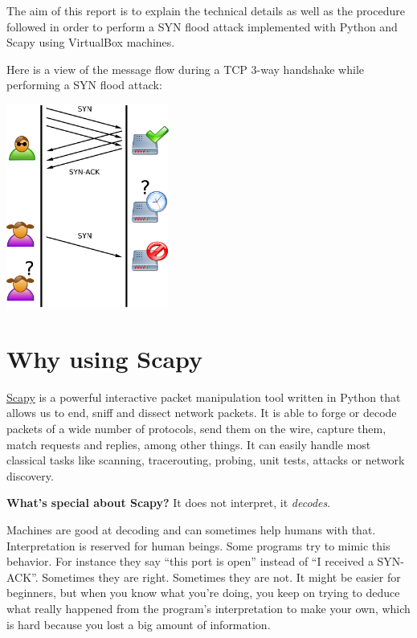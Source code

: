 \documentclass[11pt]{article}
\begin{document}
The aim of this report is to explain the technical details as well as the procedure followed in order to perform a SYN flood attack implemented with Python and Scapy using VirtualBox machines.\vspace{5mm}

Here is a view of the message flow during a TCP 3-way handshake while performing a SYN flood attack:

\begin{center}
\vfill
\includegraphics[width=0.4\textwidth]{tcp-synflood.png}\\[1cm]
\end{center}

\clearpage

\section{Why using Scapy}
\href{https://scapy.net}{Scapy} is a powerful interactive packet manipulation tool written in Python that allows us to end, sniff and dissect network packets. It is able to forge or decode packets of a wide number of protocols, send them on the wire, capture them, match requests and replies, among other things. It can easily handle most classical tasks like scanning, tracerouting, probing, unit tests, attacks or network discovery.\vspace{5mm}

\textbf{What's special about Scapy?} It does not interpret, it \emph{decodes}.\vspace{5mm}

Machines are good at decoding and can sometimes help humans with that. Interpretation is reserved for human beings. Some programs try to mimic this behavior. For instance they say “this port is open” instead of “I received a SYN-ACK”. Sometimes they are right. Sometimes they are not. It might be easier for beginners, but when you know what you’re doing, you keep on trying to deduce what really happened from the program’s interpretation to make your own, which is hard because you lost a big amount of information.\vspace{5mm}
\end{document}
